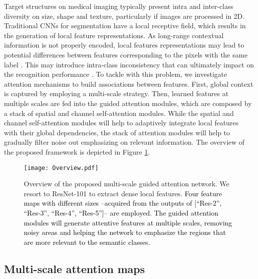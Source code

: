 \documentclass[journal]{IEEEtran}
\begin{document}
Target structures on medical imaging typically present intra and inter-class diversity on size, shape and texture, particularly if images are processed in 2D. Traditional CNNs for segmentation have a local receptive field, which results in the generation of local feature representations. As long-range contextual information is not properly encoded, local features representations may lead to potential differences between features corresponding to the pixels with the same label \cite{fu2018dual}. This may introduce intra-class inconsistency that can ultimately impact on the recognition performance \cite{peng2017large}. To tackle with this problem, we investigate attention mechanisms to build associations between features. First, global context is captured by employing a multi-scale strategy. Then, learned features at multiple scales are fed into the guided attention modules, which are composed by a stack of spatial and channel self-attention modules. While the spatial and channel self-attention modules will help to adaptively integrate local features with their global dependencies, the stack of attention modules will help to gradually filter noise out emphasizing on relevant information. The overview of the proposed framework is depicted in Figure \ref{fig:overview}.







 



\begin{figure}
    \centering
    \texttt{[image: Overview.pdf]}
    \caption{Overview of the proposed multi-scale guided attention network. We resort to ResNet-101 to extract dense local features. \textcolor{black}{ Four feature maps with different sizes --acquired from the outputs of [“Res-2”, “Res-3”, “Res-4”, “Res-5”]-- are employed. The guided attention modules will generate attentive features at multiple scales, removing noisy areas and helping the network to emphasize the regions that are more relevant to the semantic classes. }}
    \label{fig:overview}
\end{figure}

\subsection{Multi-scale attention maps}
\end{document}
